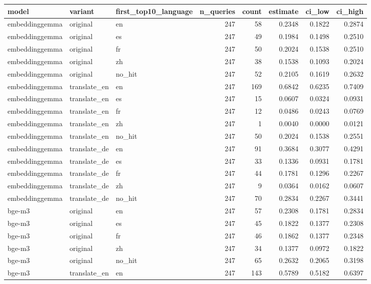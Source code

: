 \begin{tabular}{lllrrrrr}
\toprule
model & variant & first\_top10\_language & n\_queries & count & estimate & ci\_low & ci\_high \\
\midrule
embeddinggemma & original & en & 247 & 58 & 0.2348 & 0.1822 & 0.2874 \\
embeddinggemma & original & es & 247 & 49 & 0.1984 & 0.1498 & 0.2510 \\
embeddinggemma & original & fr & 247 & 50 & 0.2024 & 0.1538 & 0.2510 \\
embeddinggemma & original & zh & 247 & 38 & 0.1538 & 0.1093 & 0.2024 \\
embeddinggemma & original & no\_hit & 247 & 52 & 0.2105 & 0.1619 & 0.2632 \\
embeddinggemma & translate\_en & en & 247 & 169 & 0.6842 & 0.6235 & 0.7409 \\
embeddinggemma & translate\_en & es & 247 & 15 & 0.0607 & 0.0324 & 0.0931 \\
embeddinggemma & translate\_en & fr & 247 & 12 & 0.0486 & 0.0243 & 0.0769 \\
embeddinggemma & translate\_en & zh & 247 & 1 & 0.0040 & 0.0000 & 0.0121 \\
embeddinggemma & translate\_en & no\_hit & 247 & 50 & 0.2024 & 0.1538 & 0.2551 \\
embeddinggemma & translate\_de & en & 247 & 91 & 0.3684 & 0.3077 & 0.4291 \\
embeddinggemma & translate\_de & es & 247 & 33 & 0.1336 & 0.0931 & 0.1781 \\
embeddinggemma & translate\_de & fr & 247 & 44 & 0.1781 & 0.1296 & 0.2267 \\
embeddinggemma & translate\_de & zh & 247 & 9 & 0.0364 & 0.0162 & 0.0607 \\
embeddinggemma & translate\_de & no\_hit & 247 & 70 & 0.2834 & 0.2267 & 0.3441 \\
bge-m3 & original & en & 247 & 57 & 0.2308 & 0.1781 & 0.2834 \\
bge-m3 & original & es & 247 & 45 & 0.1822 & 0.1377 & 0.2308 \\
bge-m3 & original & fr & 247 & 46 & 0.1862 & 0.1377 & 0.2348 \\
bge-m3 & original & zh & 247 & 34 & 0.1377 & 0.0972 & 0.1822 \\
bge-m3 & original & no\_hit & 247 & 65 & 0.2632 & 0.2065 & 0.3198 \\
bge-m3 & translate\_en & en & 247 & 143 & 0.5789 & 0.5182 & 0.6397 \\

\end{tabular}

